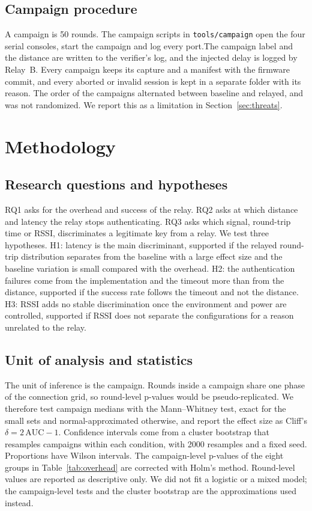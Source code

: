 \documentclass{ieeeaccess}
\begin{document}
\subsection{Campaign procedure}

A campaign is 50 rounds. The campaign scripts in \texttt{tools/campaign} open the four serial consoles, start the campaign and log every port.The campaign label and the distance are written to the verifier's log, and the injected delay is logged by Relay~B. Every campaign keeps its capture and a manifest with the firmware commit, and every aborted or invalid session is kept in a separate folder with its reason. The order of the campaigns alternated between baseline and relayed, and was not randomized. We report this as a limitation in Section~\ref{sec:threats}.

\section{Methodology}
\label{sec:method}

\subsection{Research questions and hypotheses}

RQ1 asks for the overhead and success of the relay. RQ2 asks at which distance and latency the relay stops authenticating. RQ3 asks which signal, round-trip time or RSSI, discriminates a legitimate key from a relay. We test three hypotheses. H1: latency is the main discriminant, supported if the relayed round-trip distribution separates from the baseline with a large effect size and the baseline variation is small compared with the overhead. H2: the authentication failures come from the implementation and the timeout more than from the distance, supported if the success rate follows the timeout and not the distance. H3: RSSI adds no stable discrimination once the environment and power are controlled, supported if RSSI does not separate the configurations for a reason unrelated to the relay.

\subsection{Unit of analysis and statistics}

The unit of inference is the campaign. Rounds inside a campaign share one phase of the connection grid, so round-level p-values would be pseudo-replicated. We therefore test campaign medians with the Mann--Whitney test, exact for the small sets and normal-approximated otherwise, and report the effect size as Cliff's $\delta=2\,\mathrm{AUC}-1$. Confidence intervals come from a cluster bootstrap that resamples campaigns within each condition, with 2000 resamples and a fixed seed. Proportions have Wilson intervals. The campaign-level p-values of the eight groups in Table~\ref{tab:overhead} are corrected with Holm's method. Round-level values are reported as descriptive only. We did not fit a logistic or a mixed model; the campaign-level tests and the cluster bootstrap are the approximations used instead.
\end{document}
